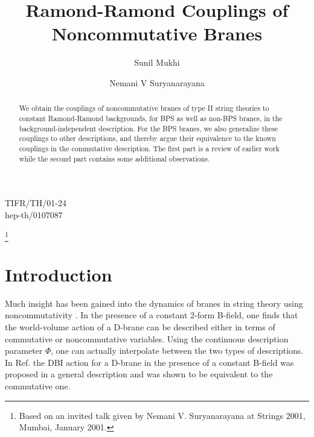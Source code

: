 \documentclass[a4paper,a4paper]{amsproc}
\theoremstyle{definition}
\theoremstyle{remark}
\numberwithin{equation}{section}
\begin{document}
\begin{flushright}
TIFR/TH/01-24\\
hep-th/0107087\\
\end{flushright}
\vspace{1truecm}

\title{Ramond-Ramond Couplings of Noncommutative Branes}

\author{Sunil Mukhi}
\thanks{Based 
on an invited talk given by Nemani V. Suryanarayana at Strings 2001,
Mumbai, January 2001\cite{talklink}.}

\author{Nemani V Suryanarayana} 
\address{Tata Institute of Fundamental
Research, Homi Bhabha Rd, Mumbai 400 005, India}



\begin{abstract}
We obtain the couplings of noncommutative branes of type II string
theories to constant Ramond-Ramond backgrounds, for BPS as well as
non-BPS branes, in the background-independent description. For the BPS
branes, we also generalize these couplings to other descriptions, and
thereby argue their equivalence to the known couplings in the
commutative description. The first part is a review of earlier work
while the second part contains some additional observations.
\end{abstract}

\maketitle

\section{Introduction}
Much insight has been gained into the dynamics of branes in string
theory using noncommutativity \cite{noncommrefs, SW}. In the presence
of a constant 2-form B-field, one finds that the world-volume action
of a D-brane can be described either in terms of commutative or
noncommutative variables. Using the continuous description parameter
$\Phi$, one can actually interpolate between the two types of
descriptions. In Ref.\cite{SW} the DBI action for a D-brane in the
presence of a constant B-field was proposed in a general description
and was shown to be equivalent to the commutative one.
\end{document}
